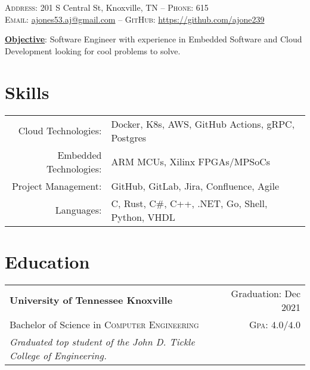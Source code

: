 \documentclass[a4paper,12pt]{article}
\begin{document}

\pagestyle{empty} %


\par{\smallskip{}
\par{\small \textsc{Address:} 201 S Central St, Knoxville, TN \---
\small \textsc{Phone:} 615\\
\textsc{Email:} \href{mailto:ajones53.aj@gmail.com}{ajones53.aj@gmail.com} \---
\textsc{GitHub:} \href{https://github.com/ajone239}{https://github.com/ajone239}
} \smallskip{}
\par{\textbf{\underline{Objective}}: Software Engineer with experience in Embedded Software and Cloud Development looking for cool problems to solve.
}\smallskip}{}



\section{Skills}
\begin{tabularx}{\textwidth}{rl}
   Cloud Technologies: & Docker, K8s, AWS, GitHub Actions, gRPC, Postgres \\
   Embedded Technologies: & ARM MCUs, Xilinx FPGAs/MPSoCs \\
   Project Management: & GitHub, GitLab, Jira, Confluence, Agile \\
   Languages: & C, Rust, C\#, C++, .NET, Go, Shell, Python, VHDL \\
\end{tabularx}

\section{Education}
\begin{tabularx}{\textwidth}{lXr}
   \textbf{University of Tennessee Knoxville} & & Graduation: Dec 2021\\
   Bachelor of Science in \textsc{Computer Engineering} &  & \normalsize \textsc{Gpa}: $4.0/4.0$\\
   \small{\emph{Graduated top student of the John D. Tickle College of Engineering.}}
\end{tabularx}
\end{document}
